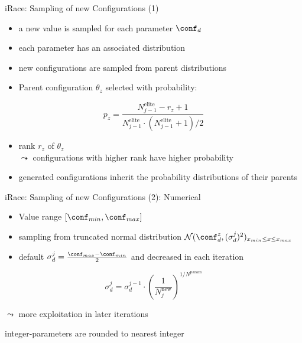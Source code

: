 \begin{frame}[c]{iRace: Sampling of new Configurations (1)}

\begin{itemize}
  \item a new value is sampled for each parameter $\conf_d$
  \item each parameter has an associated distribution
  \item new configurations are sampled from parent distributions
\end{itemize}

\pause
\medskip

\begin{itemize}
  \item Parent configuration $\theta_z$ selected with probability: 
\end{itemize}

\begin{equation}
p_z = \frac{N^{\text{elite}}_{j-1} - r_z +1}{N^{\text{elite}}_{j-1} \cdot (N^{\text{elite}}_{j-1} + 1)  /2}\nonumber
\end{equation}

\begin{itemize}
  \item rank $r_z$ of $\theta_z$\\
  $\leadsto$ configurations with higher rank have higher probability
  \bigskip
  \item generated configurations inherit the probability distributions of their parents
  
\end{itemize}

\end{frame}
\begin{frame}[c]{iRace: Sampling of new Configurations (2): Numerical}

\begin{itemize}
  \item Value range $[\conf_{min}, \conf_{max} ]$
  \item sampling from truncated normal distribution $\mathcal{N}(\conf^z_d, (\sigma^j_d)^2)_{x_{min} \leq x \leq x_{max}}$ 
  \item default $\sigma^j_d = \frac{\conf_{max} - \conf_{min}}{2}$ and decreased in each iteration
\end{itemize}

\pause

\begin{equation}
\sigma^j_d = \sigma^{j-1}_d \cdot \left(\frac{1}{N^{\text{new}}_j}\right)^{1/N^{\text{param}}}\nonumber
\end{equation}

$\leadsto$ more exploitation in later iterations

\pause
\medskip

integer-parameters are rounded to nearest integer

\end{frame}
